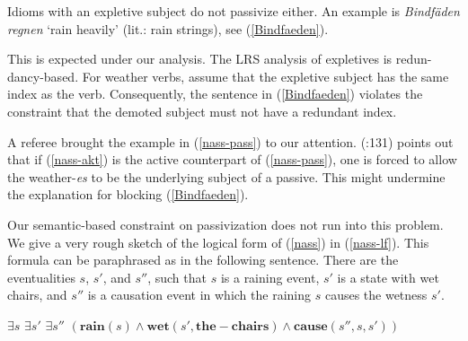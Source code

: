 \documentclass[output=paper]{langsci/langscibook}
\begin{document}
Idioms with an  expletive subject do not passivize either. An example is \textit{Bindf\"aden regnen} `rain heavily' (lit.: rain strings), see (\ref{Bindfaeden}).

\begin{exe}
\end{exe}


This is expected under our analysis. The LRS analysis of expletives is redun-dancy-based. For weather verbs, \cite{Levine:al:LRS} assume that the  expletive subject has the same index as the verb. Consequently, the sentence in (\ref{Bindfaeden}) violates the constraint that the demoted subject must not have a redundant index.

A referee brought the example in (\ref{nass-pass}) to our attention. \citeauthor{Mueller:02} (\citeyear{Mueller:02}:131) points out that if (\ref{nass-akt}) is the active counterpart of (\ref{nass-pass}), one is forced to allow the weather-\textit{es} to be the underlying subject of a passive. This might undermine the explanation for blocking (\ref{Bindfaeden}).

\begin{exe}
\ex\label{nass}
\begin{xlist}
\end{xlist}
\end{exe}

Our semantic-based constraint on passivization does not run into this problem. We give a very rough sketch of the logical form of (\ref{nass}) in (\ref{nass-lf}). This formula can be paraphrased as in the following sentence. There are the eventualities $s$, $s'$, and $s''$, such that $s$ is a raining event, $s'$ is a state with wet chairs, and $s''$ is a causation event in which the raining $s$ causes the wetness $s'$. 

\begin{exe}
\ex \label{nass-lf}
 $\exists s $ $\exists s'$ $ \exists s''$ $(\mathbf{rain}(s) \wedge \mathbf{wet}(s',\mathbf{the-chairs}) \wedge \mathbf{cause}(s'',s,s'))$
\end{exe}
\end{document}
